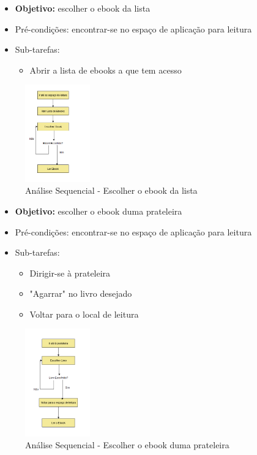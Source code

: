 \documentclass[11pt]{article}
\begin{document}
	\begin{itemize}
		\item \textbf{Objetivo:} escolher o ebook da lista
		\item Pré-condições: encontrar-se no espaço de aplicação para leitura
		\item Sub-tarefas:
		\begin{itemize}
			\item Abrir a lista de ebooks a que tem acesso
		\end{itemize}
	\end{itemize}

	\begin{figure}[H]
		\includegraphics[width=0.25\textwidth,height=0.88\textheight,keepaspectratio]{tarefa-listar-ebook}
		\centering
		\caption{Análise Sequencial - Escolher o ebook da lista}
		\label{fig:as-escolherLista}
	\end{figure}

	\begin{itemize}
		\item \textbf{Objetivo:} escolher o ebook duma prateleira
		\item Pré-condições: encontrar-se no espaço de aplicação para leitura
		\item Sub-tarefas:
		\begin{itemize}
			\item Dirigir-se à prateleira
			\item "Agarrar" no livro desejado
			\item Voltar para o local de leitura
		\end{itemize}
	\end{itemize}

	\begin{figure}[H]
		\includegraphics[width=0.25\textwidth,height=0.88\textheight,keepaspectratio]{tarefa-livro-prateleira}
		\centering
		\caption{Análise Sequencial - Escolher o ebook duma prateleira}
		\label{fig:as-escolherPrateleira}
	\end{figure}
\end{document}
